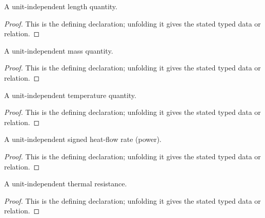 \begin{definition}[DimLength]
  \label{decl:physics:IPhO_2026_4_C_7:DimLength}
  A unit-independent length quantity.
\end{definition}
\begin{proof}
  This is the defining declaration; unfolding it gives the stated typed data or relation.
\end{proof}

\begin{definition}[DimMass]
  \label{decl:physics:IPhO_2026_4_C_7:DimMass}
  A unit-independent mass quantity.
\end{definition}
\begin{proof}
  This is the defining declaration; unfolding it gives the stated typed data or relation.
\end{proof}

\begin{definition}[DimTemperature]
  \label{decl:physics:IPhO_2026_4_C_7:DimTemperature}
  A unit-independent temperature quantity.
\end{definition}
\begin{proof}
  This is the defining declaration; unfolding it gives the stated typed data or relation.
\end{proof}

\begin{definition}[DimPower]
  \label{decl:physics:IPhO_2026_4_C_7:DimPower}
  A unit-independent signed heat-flow rate (power).
\end{definition}
\begin{proof}
  This is the defining declaration; unfolding it gives the stated typed data or relation.
\end{proof}

\begin{definition}[DimThermalResistance]
  \label{decl:physics:IPhO_2026_4_C_7:DimThermalResistance}
  A unit-independent thermal resistance.
\end{definition}
\begin{proof}
  This is the defining declaration; unfolding it gives the stated typed data or relation.
\end{proof}

